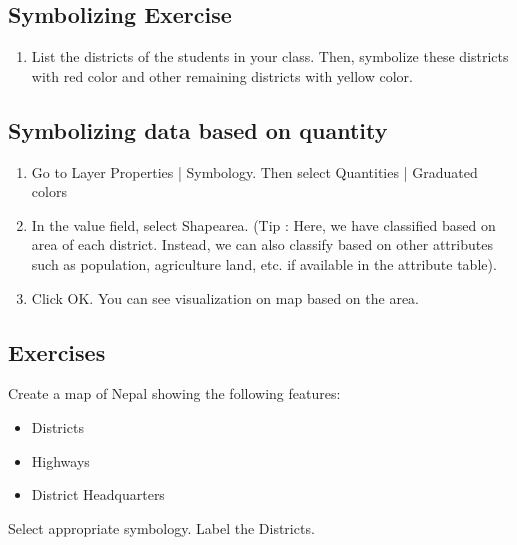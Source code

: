 \subsection{Symbolizing Exercise}
\begin{enumerate}
\item{List the districts of the students in your class. Then, symbolize these districts with red color and other remaining districts with yellow color.}
\end{enumerate}

\subsection{Symbolizing data based on quantity}
\begin{enumerate}
\item{Go to Layer Properties | Symbology. Then select Quantities | Graduated colors}
\item{In the value field, select Shape\textunderscore area.  (Tip : Here, we have classified based on area of each district. Instead, we can also classify based on other attributes such as population, agriculture land, etc. if available in the attribute table).}
\item{Click OK. You can see visualization on map based on the area.}
\end{enumerate}

\subsection{Exercises}
Create a map of Nepal showing the following features:
\begin{itemize}
\item{Districts}
\item{Highways}
\item{District Headquarters}
\end{itemize}
Select appropriate symbology. Label the Districts. 